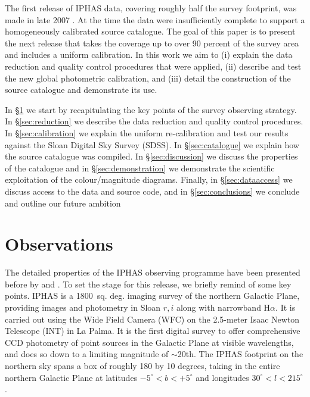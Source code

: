 \documentclass[useAMS,usenatbib]{mn2e}
\begin{document}
The first release of IPHAS data, 
covering roughly half the survey footprint,
was made in late 2007 \citep{Gonzalez-Solares2008}. 
At the time the data were insufficiently complete 
to support a homogeneously calibrated source catalogue.
The goal of this paper is to present the next release 
that takes the coverage up to over 90 percent of the survey area 
and includes a uniform calibration.
In this work we aim to
(i) explain the data reduction 
and quality control procedures that were applied,
(ii) describe and test the new global photometric calibration, and 
(iii) detail the construction of the source catalogue
and demonstrate its use.

In \S\ref{sec:observations} we start by recapitulating the key points
of the survey observing strategy.
In \S\ref{sec:reduction} we describe the data reduction
and quality control procedures.
In \S\ref{sec:calibration} we explain the uniform re-calibration
and test our results against the Sloan Digital Sky Survey (SDSS).
In \S\ref{sec:catalogue} we explain how the source catalogue was compiled.
In \S\ref{sec:discussion} we discuss the properties of the catalogue
and in \S\ref{sec:demonstration} we demonstrate
the scientific exploitation of the colour/magnitude diagrams.
Finally, in \S\ref{sec:dataaccess} we discuss access
to the data and source code,
and in \S\ref{sec:conclusions} we conclude and outline
our future ambition


\section{Observations}
\label{sec:observations}

The detailed properties of the IPHAS observing programme 
have been presented before 
by \citet{Drew2005} and \citet{Gonzalez-Solares2008}. 
To set the stage for this release, we briefly remind of some key points.
IPHAS is a 1800~sq. deg. imaging survey of the northern Galactic Plane, 
providing images and photometry in Sloan $r, i$ 
along with narrowband H$\alpha$. 
It is carried out using the Wide Field Camera (WFC) 
on the 2.5-meter Isaac Newton Telescope (INT) in La Palma. 
It is the first digital survey to offer comprehensive CCD photometry
of point sources in the Galactic Plane at visible wavelengths, 
and does so down to a limiting magnitude of $\sim$20th.
The IPHAS footprint on the northern sky spans a box 
of roughly 180 by 10 degrees, 
taking in the entire northern Galactic Plane 
at latitudes $-5^{\circ} < b < +5^{\circ}$ 
and longitudes $30^{\circ} < l < 215^{\circ}$.
\end{document}
